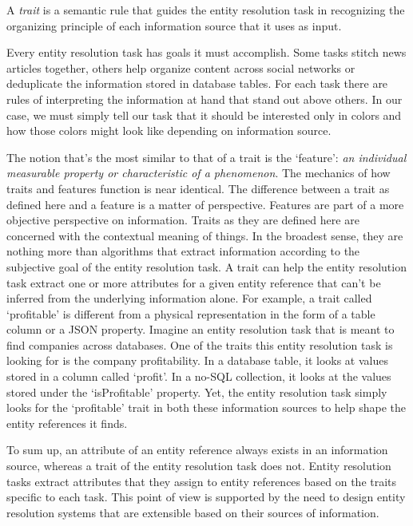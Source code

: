 \documentclass[11pt]{article}
\begin{document}
    \begin{defn}
        A \textit{trait} is a semantic rule that guides the entity resolution
        task in recognizing the organizing principle of each information source
        that it uses as input.
    \end{defn}

    Every entity resolution task has goals it must accomplish.
    Some tasks stitch news articles together, others help organize content
    across social networks or deduplicate the information stored in database
    tables.
    For each task there are rules of interpreting the information at hand that
    stand out above others.
    In our case, we must simply tell our task that it should be interested only
    in colors and how those colors might look like depending on information
    source.
    
    The notion that's the most similar to that of a trait is the `feature':
    \textit{an individual measurable property or characteristic of a
    phenomenon}\cite{bishop2006pattern}.
    The mechanics of how traits and features function is near identical.
    The difference between a trait as defined here and a feature is a matter of
    perspective.
    Features are part of a more objective perspective on information.
    Traits as they are defined here are concerned with the contextual meaning of
    things.
    In the broadest sense, they are nothing more than algorithms that extract
    information according to the subjective goal of the entity resolution task.
    A trait can help the entity resolution task extract one or more attributes
    for a given entity reference that can't be inferred from the underlying
    information alone.
    For example, a trait called `profitable' is different from a physical
    representation in the form of a table column or a JSON property.
    Imagine an entity resolution task that is meant to find companies across
    databases.
    One of the traits this entity resolution task is looking for is the company
    profitability.
    In a database table, it looks at values stored in a column called `profit'.
    In a no-SQL collection, it looks at the values stored under the
    `isProfitable' property.
    Yet, the entity resolution task simply looks for the `profitable' trait in
    both these information sources to help shape the entity references it finds.

    To sum up, an attribute of an entity reference always exists in an
    information source, whereas a trait of the entity resolution task does not.
    Entity resolution tasks extract attributes that they assign to entity
    references based on the traits specific to each task.
    This point of view is supported by the need to design entity resolution
    systems that are extensible based on their sources of
    information\cite{fever2009}\cite{magellan2020}\cite{oyster2012}.
\end{document}

